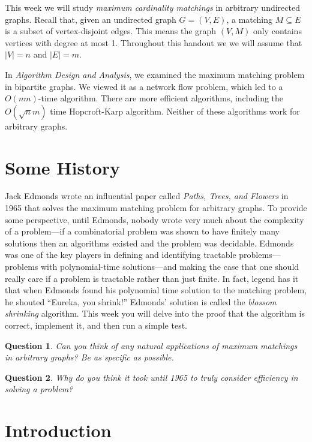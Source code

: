 \documentclass[11pt]{article}
\newtheorem{question}{Question}
\begin{document}
This week we will study {\em maximum cardinality matchings} in arbitrary undirected graphs.  Recall that, given an undirected graph $G=(V,E)$, a matching $M \subseteq E$ is a subset of vertex-disjoint edges.  This means the graph $(V,M)$ only contains vertices with degree at most 1.  Throughout this handout we we will assume that $|V|=n$ and $|E|=m$. 

 In {\em Algorithm Design and Analysis}, we examined the maximum matching problem in bipartite graphs.  We viewed it as a network flow problem, which led to a $O(n m)$-time algorithm. There are more efficient algorithms, including the $O(\sqrt{n}m)$ time Hopcroft-Karp algorithm.  Neither of these algorithms work for arbitrary graphs.

\section{Some History}  

Jack Edmonds wrote an influential paper called {\em Paths, Trees, and Flowers} in 1965 that solves the maximum matching problem for arbitrary graphs.  To provide some perspective, until Edmonds, nobody wrote very much about the complexity of a problem---if a combinatorial problem was shown to have finitely many solutions then an algorithms existed and the problem was decidable.  Edmonds was one of the key players in defining and identifying tractable problems---problems with polynomial-time solutions---and making the case that one should really care if a problem is tractable rather than just finite.  In fact, legend has it that when Edmonds found his polynomial time solution to the matching problem, he shouted ``Eureka, you shrink!''  Edmonds' solution is called the {\em blossom shrinking} algorithm.  This week you will delve into the proof that the algorithm is correct, implement it, and then run a simple test.

\begin{question}
Can you think of any natural applications of maximum matchings in arbitrary graphs?  Be as specific as possible.
\end{question}

\begin{question}
Why do you think it took until 1965 to truly consider efficiency in solving a problem?
\end{question}

\section{Introduction}
\end{document}
